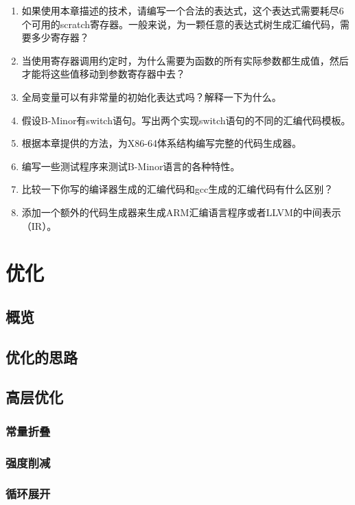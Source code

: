 \documentclass[cn,11pt,chinese]{elegantbook}
\begin{document}
\begin{enumerate}
  \item 如果使用本章描述的技术，请编写一个合法的表达式，这个表达式需要耗尽6个可用的scratch寄存器。一般来说，为一颗任意的表达式树生成汇编代码，需要多少寄存器？
  \item 当使用寄存器调用约定时，为什么需要为函数的所有实际参数都生成值，然后才能将这些值移动到参数寄存器中去？
  \item 全局变量可以有非常量的初始化表达式吗？解释一下为什么。
  \item 假设B-Minor有switch语句。写出两个实现switch语句的不同的汇编代码模板。
  \item 根据本章提供的方法，为X86-64体系结构编写完整的代码生成器。
  \item 编写一些测试程序来测试B-Minor语言的各种特性。
  \item 比较一下你写的编译器生成的汇编代码和gcc生成的汇编代码有什么区别？
  \item 添加一个额外的代码生成器来生成ARM汇编语言程序或者LLVM的中间表示（IR）。
\end{enumerate}

\chapter{优化}

\section{概览}

\section{优化的思路}

\section{高层优化}

\subsection{常量折叠}

\subsection{强度削减}

\subsection{循环展开}
\end{document}
